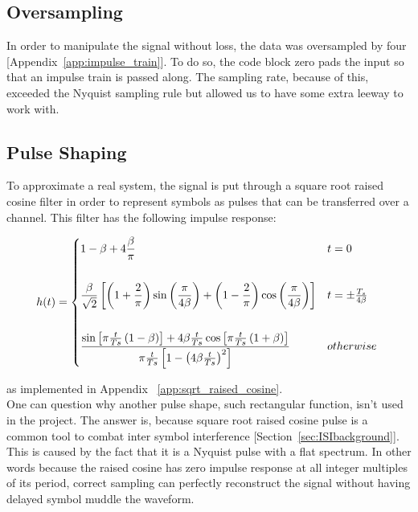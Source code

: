 \documentclass[]{article}
\begin{document}
\subsection{Oversampling}
\label{sec:oversample}
In order to manipulate the signal without loss, the data was oversampled by four [Appendix~\ref{app:impulse_train}].  To do so, the code block zero pads the input so that an impulse train is passed along.  The sampling rate, because of this, exceeded the Nyquist sampling rule but allowed us to have some extra leeway to work with.   

\subsection{Pulse Shaping}
\label{sec:srrc}
To approximate a real system, the signal is put through a square root raised cosine filter in order to represent symbols as pulses that can be transferred over a channel. This filter has the following impulse response:

 \[
 h(t) = \begin{dcases*}
        1-\beta+4\frac{\beta}{\pi} &  $t = 0$\\ \\        
        \frac{\beta}{\sqrt{2}}\left[\left(1+\frac{2}{\pi}\right)\sin\left(\frac{\pi}{4\beta}\right)+\left(1-\frac{2}{\pi}\right)\cos\left(\frac{\pi}{4\beta}\right)\right] & $t=\pm \frac{T_s}{4\beta}$ \\ \\
        \frac{\sin\left[\pi\frac{t}{Ts}\left(1-\beta\right)\right]+4\beta\frac{t}{Ts}\cos\left[\pi\frac{t}{Ts}\left(1+\beta\right)\right]}{\pi\frac{t}{Ts}\left[1-\left(4\beta\frac{t}{Ts}\right)^2\right]} & $otherwise$ \\
        \end{dcases*}
\]

as implemented in Appendix ~\ref{app:sqrt_raised_cosine}.  \\

One can question why another pulse shape, such rectangular function, isn't used in the project. The answer is, because square root raised cosine pulse is a common tool to combat inter symbol interference [Section~\ref{sec:ISIbackground}].  This is caused by the fact that it is a Nyquist pulse with a flat spectrum. In other words because the raised cosine has zero impulse response at all integer multiples of its period, correct sampling can perfectly reconstruct the signal without having delayed symbol muddle the waveform. 
\end{document}
